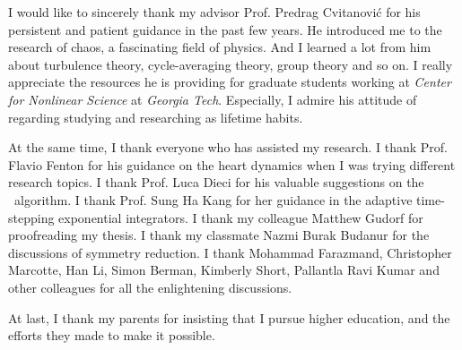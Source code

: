 I would like to sincerely thank my advisor Prof. Predrag Cvitanovi\'c for
his persistent and patient guidance in the past few years.
He introduced me to the research of chaos, a fascinating field of 
physics. And I learned a lot from him about turbulence theory, 
cycle-averaging theory, group theory and so on. I really
appreciate the resources he is providing for graduate students
working at \emph{Center for Nonlinear Science} at \emph{Georgia Tech}.
Especially, I admire his attitude of regarding studying and researching
as lifetime habits.

At the same time, I thank everyone who has assisted my research.
I thank Prof. Flavio Fenton for his guidance on the heart dynamics 
when I was trying different research topics. 
I thank Prof. Luca Dieci for his valuable suggestions on the \ped\ 
algorithm. I thank Prof. Sung Ha Kang for her guidance in the adaptive 
time-stepping exponential integrators.
I thank my colleague Matthew Gudorf for proofreading my thesis.
I thank my classmate Nazmi Burak Budanur for the 
discussions of symmetry reduction. 
I thank Mohammad Farazmand, Christopher Marcotte, Han Li,
Simon Berman, Kimberly Short,
Pallantla Ravi Kumar and other colleagues 
for all the enlightening discussions.


At last, I thank my parents for insisting that I pursue 
higher education, and the efforts they made to make it possible.

